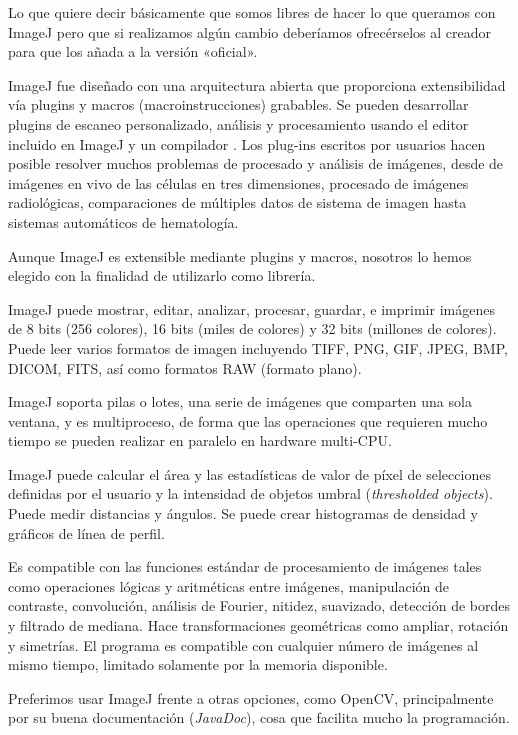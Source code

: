 Lo que quiere decir básicamente que somos libres de hacer lo que queramos con ImageJ pero que si realizamos algún cambio deberíamos ofrecérselos al creador para que los añada a la versión «oficial».

ImageJ fue diseñado con una arquitectura abierta que proporciona extensibilidad vía plugins \java{} y macros (macroinstrucciones) grabables. Se pueden desarrollar plugins de escaneo personalizado, análisis y procesamiento usando el editor incluido en ImageJ y un compilador \java{}. Los plug-ins escritos por usuarios hacen posible resolver muchos problemas de procesado y análisis de imágenes, desde de imágenes en vivo de las células en tres dimensiones, procesado de imágenes radiológicas, comparaciones de múltiples datos de sistema de imagen hasta sistemas automáticos de hematología.

Aunque ImageJ es extensible mediante plugins y macros, nosotros lo hemos elegido con la finalidad de utilizarlo como librería.

ImageJ puede mostrar, editar, analizar, procesar, guardar, e imprimir imágenes de 8 bits (256 colores), 16 bits (miles de colores) y 32 bits (millones de colores). Puede leer varios formatos de imagen incluyendo TIFF, PNG, GIF, JPEG, BMP, DICOM, FITS, así como formatos RAW (formato plano).

ImageJ soporta pilas o lotes, una serie de imágenes que comparten una sola ventana, y es multiproceso, de forma que las operaciones que requieren mucho tiempo se pueden realizar en paralelo en hardware multi-CPU.

ImageJ puede calcular el área y las estadísticas de valor de píxel de selecciones definidas por el usuario y la intensidad de objetos umbral (\emph{thresholded objects}). Puede medir distancias y ángulos. Se puede crear histogramas de densidad y gráficos de línea de perfil.

Es compatible con las funciones estándar de procesamiento de imágenes tales como operaciones lógicas y aritméticas entre imágenes, manipulación de contraste, convolución, análisis de Fourier, nitidez, suavizado, detección de bordes y filtrado de mediana. Hace transformaciones geométricas como ampliar, rotación y simetrías. El programa es compatible con cualquier número de imágenes al mismo tiempo, limitado solamente por la memoria disponible.

Preferimos usar ImageJ frente a otras opciones, como OpenCV, principalmente por su buena documentación (\textit{JavaDoc}), cosa que facilita mucho la programación.


